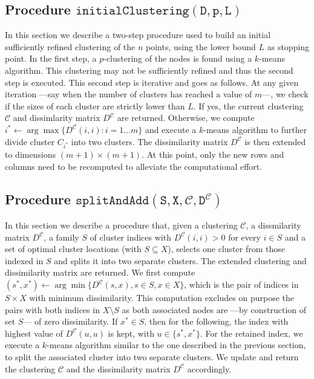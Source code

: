 \documentclass[a4paper,10pt]{article}
\newcommand{\mC}{\mathcal{C}}
\newcommand{\DmC}{D^{\mC}}
\newcommand{\initclust}[3]{$\mathtt{initialClustering({#1}, {#2}, {#3})}$}
\newcommand{\splitadd}[4]{$\mathtt{splitAndAdd({#1}, {#2}, {#3}, {#4})}$}
\begin{document}
\subsection{Procedure \initclust{D}{p}{L}\label{section:decrclust:initclust}}

In this section we describe a two-step procedure used to build an initial sufficiently refined clustering of the $n$ points, using the lower bound $L$ as stopping point. In the first step, a $p$-clustering of the nodes is found using a $k$-means algorithm. This clustering may not be sufficiently refined and thus the second step is executed. This second step is iterative and goes as follows. At any given iteration ---say when the number of clusters has reached a value of $m$---, we check if the sizes of each cluster are strictly lower than $L$. If yes, the current clustering $\mC$ and dissimlarity matrix $\DmC$ are returned. Otherwise, we compute $i^*\leftarrow\arg\max\{\DmC(i, i): i = 1\ldots m\}$ and execute a $k$-means algorithm to further divide cluster $C_{i^*}$ into two clusters. The dissimilarity matrix $\DmC$ is then extended to dimensions $(m + 1)\times (m + 1)$. At this point, only the new rows and columns need to be recomputed to alleviate the computational effort.

\subsection{Procedure \splitadd{S}{X}{\mC}{\DmC}\label{section:decrclust:splitadd}}

In this section we describe a procedure that, given a clustering $\mC$, a dissmilarity matrix $\DmC$, a family $S$ of cluster indices with $\DmC(i, i) > 0$ for every $i\in S$ and a set of optimal cluster locations (with $S\subseteq X$), selects one cluster from those indexed in $S$ and splits it into two separate clusters. The extended clustering and dissimilarity matrix are returned. We first compute $(s^*, x^*)\leftarrow\arg\min\{\DmC(s, x), s\in S, x\in X\}$, which is the pair of indices in $S\times X$ with minimum dissimilarity. This computation excludes on purpose the pairs with both indices in $X\setminus S$ as both associated nodes are ---by construction of set $S$--- of zero dissimilarity. If $x^*\in S$, then for the following, the index with highest value of $\DmC(u, u)$ is kept, with $u \in \{s^*, x^*\}$. For the retained index, we execute a $k$-means algorithm similar to the one described in the previous section, to split the associated cluster into two separate clusters. We update and return the clustering $\mC$ and the dissimilarity matrix $\DmC$ accordingly.
\end{document}
